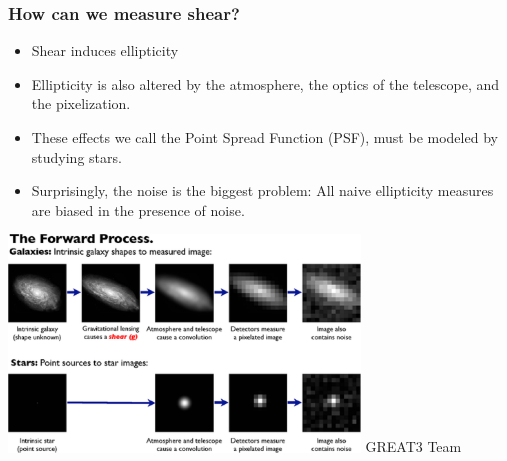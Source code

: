 \documentclass{beamer}
\begin{document}
\frame
{
    \frametitle{How can we measure shear?}

    \begin{itemize}

        \item Shear induces ellipticity

        \item Ellipticity is also altered by the atmosphere, the optics
            of the telescope, and the pixelization.
        
        \item These effects we call the Point Spread Function (PSF),
            must be modeled by studying stars.

        \item Surprisingly, the noise is the biggest problem:  All
            naive ellipticity measures are biased in the presence of
            noise.

    \end{itemize}
    \begin{center}
        \includegraphics[width=0.7\textwidth]{great08-forward-process.png}
        \newline
        {\tiny GREAT3 Team}
    \end{center}
}
\end{document}
